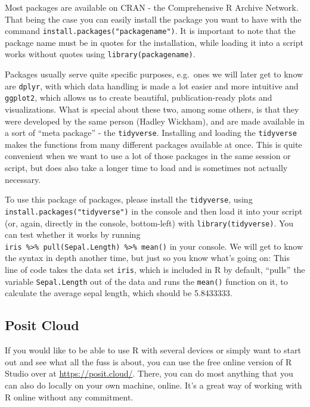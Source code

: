 \documentclass[
]{book}
\begin{document}
Most packages are available on CRAN - the Comprehensive R Archive Network.
That being the case you can easily install the package you want to have with the command \texttt{install.packages("packagename")}.
It is important to note that the package name must be in quotes for the installation, while loading it into a script works without quotes using \texttt{library(packagename)}.

Packages usually serve quite specific purposes, e.g.~ones we will later get to know are \texttt{dplyr}, with which data handling is made a lot easier and more intuitive and \texttt{ggplot2}, which allows us to create beautiful, publication-ready plots and visualizations.
What is special about these two, among some others, is that they were developed by the same person (Hadley Wickham), and are made available in a sort of ``meta package'' - the \texttt{tidyverse}.
Installing and loading the \texttt{tidyverse} makes the functions from many different packages available at once.
This is quite convenient when we want to use a lot of those packages in the same session or script, but does also take a longer time to load and is sometimes not actually necessary.

To use this package of packages, please install the \texttt{tidyverse}, using \texttt{install.packages("tidyverse")} in the console and then load it into your script (or, again, directly in the console, bottom-left) with \texttt{library(tidyverse)}.
You can test whether it works by running \texttt{iris\ \%\textgreater{}\%\ pull(Sepal.Length)\ \%\textgreater{}\%\ mean()} in your console.
We will get to know the syntax in depth another time, but just so you know what's going on:
This line of code takes the data set \texttt{iris}, which is included in R by default, ``pulls'' the variable \texttt{Sepal.Length} out of the data and runs the \texttt{mean()} function on it, to calculate the average sepal length, which should be 5.8433333.

\subsection*{Posit Cloud}\label{posit-cloud}

If you would like to be able to use R with several devices or simply want to start out and see what all the fuss is about, you can use the free online version of R Studio over at \url{https://posit.cloud/}.
There, you can do most anything that you can also do locally on your own machine, online.
It's a great way of working with R online without any commitment.
\end{document}
